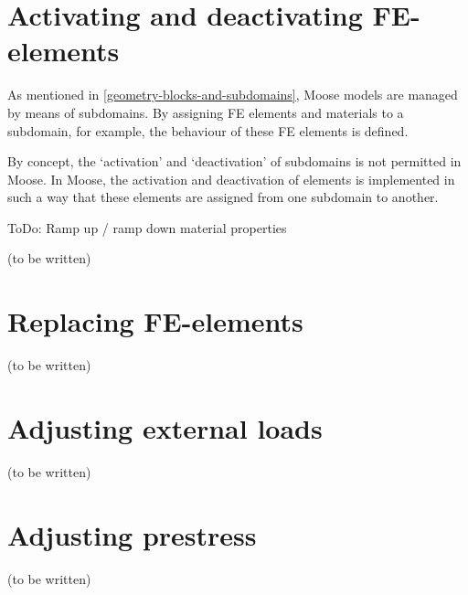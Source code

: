 \section{Activating and deactivating FE-elements}
\label{chap:stages-element-activation-deactivation}

As mentioned in \autoref{geometry-blocks-and-subdomains}, Moose models are
managed by means of subdomains. By assigning FE elements and materials to a
subdomain, for example, the behaviour of these FE elements is defined.

By concept, the ‘activation’ and ‘deactivation’ of subdomains is not permitted
in Moose. In Moose, the activation and deactivation of elements is implemented
in such a way that these elements are assigned from one subdomain to another.

ToDo: Ramp up / ramp down material properties

(to be written)

\section{Replacing FE-elements}
\label{chap:stages-element-replacement}

(to be written)

\section{Adjusting external loads}
\label{chap:stages-loads}

(to be written)

\section{Adjusting prestress}
\label{chap:stages-prestress}

(to be written)